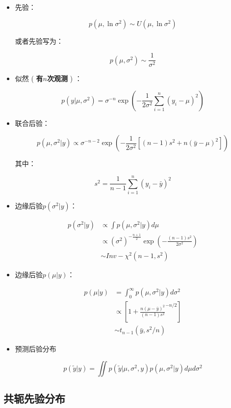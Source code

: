 \begin{itemize}
\item
  先验：

\begin{equation}
  p(\mu,\ln\sigma^2)\sim U(\mu,\ln \sigma^2)
\end{equation}

  或者先验写为：

  \[p(\mu,\sigma^2)\sim\frac{1}{\sigma^2}\]
\item
  似然 ( \textbf{有\(n\)次观测 }) ：

  \[p(y|\mu,\sigma^2)=\sigma^{-n}\exp \left(
  -\frac{1}{2\sigma^2}\sum_{i=1}^{n}(y_i-\mu)^2
  \right)\]
\item
  联合后验：

  \[p(\mu,\sigma^2|y)\propto \sigma^{-n-2}\exp\left(
  -\frac{1}{2\sigma^2}[(n-1)s^2+n(\bar{y}-\mu)^2]
  \right)\]

  其中：

  \[s^2=\frac{1}{n-1}\sum_{i=1}^{n}(y_i-\bar y)^2\]
\item
  边缘后验\(p(\sigma^2|y)\)：

\begin{equation}
  \begin{aligned}
  p(\sigma^2|y)
  &\propto \int p(\mu,\sigma^2|y)d\mu\\
  &\propto(\sigma^2)^{-\frac{n+1}{2}}\exp\left(
  -\frac{(n-1)s^2}{2\sigma^2}
  \right)\\
  &\sim Inv-\chi^2(n-1,s^2)
  \end{aligned}
\end{equation}

\item
  边缘后验\(p(\mu|y)\)：

  \begin{align*}
  p(\mu|y)
  &=\int_0^{\infty}p(\mu,\sigma^2|y)d\sigma^2\\
  &\propto\left[
  1+\frac{n(\mu-\bar y)^2}{(n-1)s^2}^{-n/2}
  \right] \\
  &\sim t_{n-1}(\bar y,s^2/n)
  \end{align*}
\item
  预测后验分布

  \[p(\widetilde y|y)=\iint  p(\widetilde y |\mu,\sigma^2,y)p(\mu,\sigma^2|y)
  d\mu d\sigma^2\]
\end{itemize}

\subsection{共轭先验分布}

